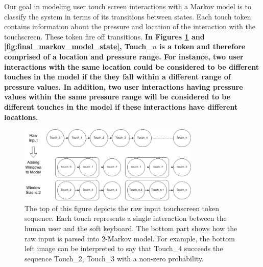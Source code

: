 \documentclass{acm_proc_article-sp}
\begin{document}




Our goal in modeling user touch screen interactions with a Markov model is to classify the system in terms of its transitions between states. 
Each touch token contains information about the pressure and location of the interaction with the touchscreen.
These token fire off transitions.
\textbf{
In Figures \ref{fig:markov_model_building} and \ref{fig:final_markov_model_state}, 
Touch\_$n$ is a token and therefore comprised of a location and pressure range.
For instance, two user interactions with the same location
could be considered to be different touches in the model if
the they fall within a different range of pressure values.
In addition, two user interactions having pressure values
within the same pressure range will be considered to be different touches in the model if
these interactions have different locations.
}

\begin{figure}
\centering
\includegraphics[width=3.4in]{figures/markov_model_building.png}
\caption{The top of this figure depicts the raw input touchscreen token sequence. Each touch represents a single interaction between the human user and the soft keyboard. The bottom part shows how the raw input is parsed into 2-Markov model. For example, the bottom left image can be interpreted to say that Touch\_4 succeeds the sequence Touch\_2, Touch\_3 with a non-zero probability.}
\label{fig:markov_model_building}
\end{figure}
\end{document}
